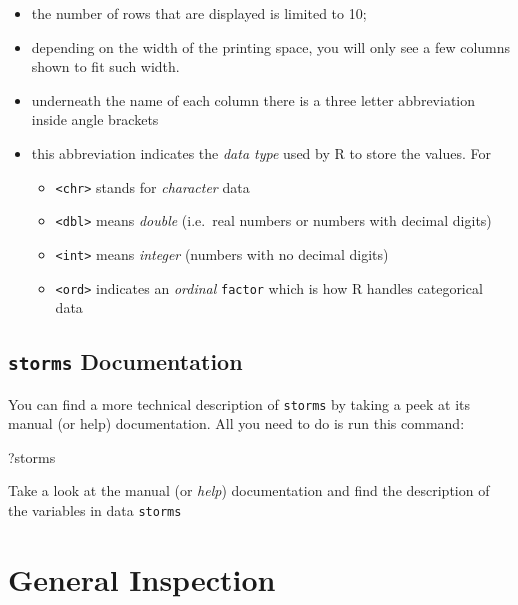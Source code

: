 \documentclass[
]{book}
\newenvironment{Shaded}{\begin{snugshade}}{\end{snugshade}}
\newcommand{\NormalTok}[1]{#1}
\providecommand{\tightlist}{%
  \setlength{\itemsep}{0pt}\setlength{\parskip}{0pt}}
\begin{document}
\begin{itemize}
\item
  the number of rows that are displayed is limited to 10;
\item
  depending on the width of the printing space, you will only see a few columns
  shown to fit such width.
\item
  underneath the name of each column there is a three letter abbreviation
  inside angle brackets
\item
  this abbreviation indicates the \emph{data type} used by R to store the values. For

  \begin{itemize}
  \tightlist
  \item
    \texttt{\textless{}chr\textgreater{}} stands for \emph{character} data
  \item
    \texttt{\textless{}dbl\textgreater{}} means \emph{double} (i.e.~real numbers or numbers with decimal digits)
  \item
    \texttt{\textless{}int\textgreater{}} means \emph{integer} (numbers with no decimal digits)
  \item
    \texttt{\textless{}ord\textgreater{}} indicates an \emph{ordinal} \texttt{factor} which is how R handles categorical
    data
  \end{itemize}
\end{itemize}

\hypertarget{storms-documentation}{%
\subsection{\texorpdfstring{\texttt{storms} Documentation}{storms Documentation}}\label{storms-documentation}}

You can find a more technical description of \texttt{storms} by taking a peek at its
manual (or help) documentation. All you need to do is run this command:

\begin{Shaded}
\begin{Highlighting}[]
\NormalTok{?storms}
\end{Highlighting}
\end{Shaded}

Take a look at the manual (or \emph{help}) documentation and find the description
of the variables in data \texttt{storms}

\hypertarget{general-inspection}{%
\section{General Inspection}\label{general-inspection}}
\end{document}
